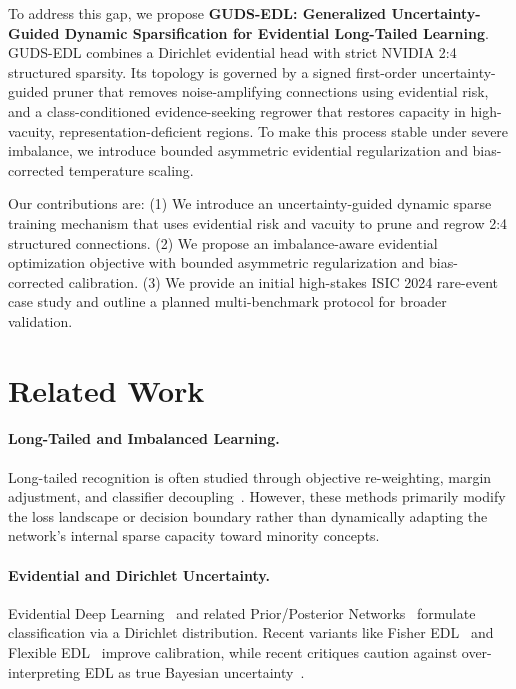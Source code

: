 \documentclass[letterpaper]{article} %
\begin{document}
To address this gap, we propose \textbf{GUDS-EDL: Generalized Uncertainty-Guided Dynamic Sparsification for Evidential Long-Tailed Learning}. GUDS-EDL combines a Dirichlet evidential head with strict NVIDIA 2:4 structured sparsity. Its topology is governed by a signed first-order uncertainty-guided pruner that removes noise-amplifying connections using evidential risk, and a class-conditioned evidence-seeking regrower that restores capacity in high-vacuity, representation-deficient regions. To make this process stable under severe imbalance, we introduce bounded asymmetric evidential regularization and bias-corrected temperature scaling.

Our contributions are: (1) We introduce an uncertainty-guided dynamic sparse training mechanism that uses evidential risk and vacuity to prune and regrow 2:4 structured connections. (2) We propose an imbalance-aware evidential optimization objective with bounded asymmetric regularization and bias-corrected calibration. (3) We provide an initial high-stakes ISIC 2024 rare-event case study and outline a planned multi-benchmark protocol for broader validation.

\section{Related Work}
\paragraph{Long-Tailed and Imbalanced Learning.} Long-tailed recognition is often studied through objective re-weighting, margin adjustment, and classifier decoupling~\cite{cui2019class,cao2019learning,menon2021long,ren2020balanced,kang2019decoupling}. However, these methods primarily modify the loss landscape or decision boundary rather than dynamically adapting the network's internal sparse capacity toward minority concepts.

\paragraph{Evidential and Dirichlet Uncertainty.} Evidential Deep Learning~\cite{sensoy2018evidential} and related Prior/Posterior Networks~\cite{malinin2018predictive} formulate classification via a Dirichlet distribution. Recent variants like Fisher EDL~\cite{deng2023fisher} and Flexible EDL~\cite{flexible_edl2023,yoon2025flexible} improve calibration, while recent critiques caution against over-interpreting EDL as true Bayesian uncertainty~\cite{shen2024mirage}.
\end{document}
